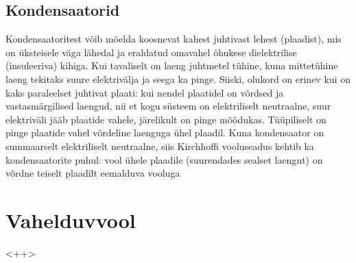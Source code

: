 \documentclass[a4paper,11pt,twocolumn]{article}
\begin{document}
\subsection{Kondensaatorid}
Kondensaatoritest võib mõelda koosnevat kahest juhtivast lehest (plaadist), mis on üksteisele väga lähedal ja eraldatud omavahel õhukese dielektrilise (insuleeriva) kihiga. Kui tavaliselt on laeng juhtmetel tühine, kuna mittetühine laeng tekitaks suure elektrivälja ja seega ka pinge. Siiski, olukord on erinev kui on kaks paraleelset juhtivat plaati: kui nendel plaatidel on võrdsed ja vastasmärgilised laengud, nii et kogu süsteem on elektriliselt neutraalne, suur elektriväli jääb plaatide vahele, järelikult on pinge mõõdukas. Tüüpiliselt on pinge plaatide vahel võrdeline laenguga ühel plaadil. Kuna kondensaator on summaarselt elektriliselt neutraalne, siis Kirchhoffi vooluseadus kehtib ka kondensaatorite puhul: vool ühele plaadile (suurendades sealset laengut) on võrdne teiselt plaadilt eemalduva vooluga


\section{Vahelduvvool}

<++>
\end{document}
